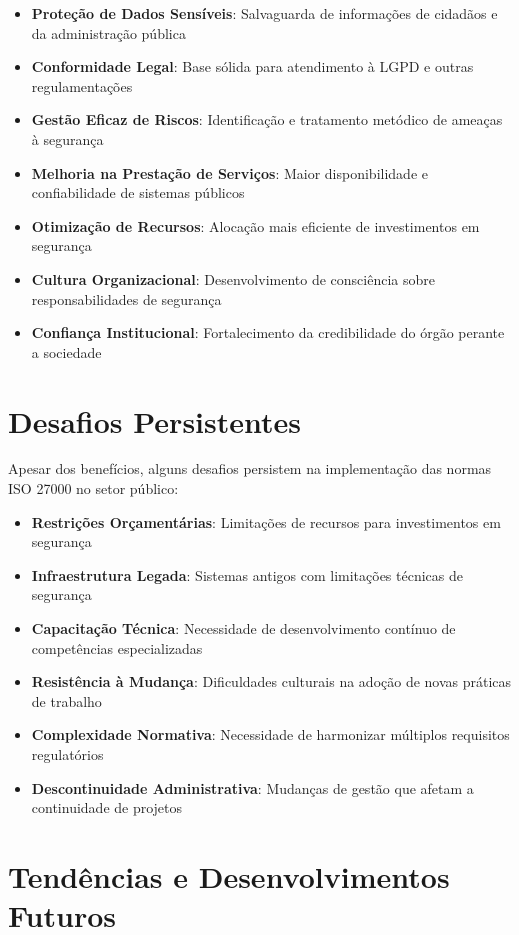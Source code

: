 \documentclass[12pt,a4paper]{report}
\begin{document}
\begin{itemize}
  \item \textbf{Proteção de Dados Sensíveis}: Salvaguarda de informações de cidadãos e da administração pública
  \item \textbf{Conformidade Legal}: Base sólida para atendimento à LGPD e outras regulamentações
  \item \textbf{Gestão Eficaz de Riscos}: Identificação e tratamento metódico de ameaças à segurança
  \item \textbf{Melhoria na Prestação de Serviços}: Maior disponibilidade e confiabilidade de sistemas públicos
  \item \textbf{Otimização de Recursos}: Alocação mais eficiente de investimentos em segurança
  \item \textbf{Cultura Organizacional}: Desenvolvimento de consciência sobre responsabilidades de segurança
  \item \textbf{Confiança Institucional}: Fortalecimento da credibilidade do órgão perante a sociedade
\end{itemize}

\section{Desafios Persistentes}

Apesar dos benefícios, alguns desafios persistem na implementação das normas ISO 27000 no setor público:

\begin{itemize}
  \item \textbf{Restrições Orçamentárias}: Limitações de recursos para investimentos em segurança
  \item \textbf{Infraestrutura Legada}: Sistemas antigos com limitações técnicas de segurança
  \item \textbf{Capacitação Técnica}: Necessidade de desenvolvimento contínuo de competências especializadas
  \item \textbf{Resistência à Mudança}: Dificuldades culturais na adoção de novas práticas de trabalho
  \item \textbf{Complexidade Normativa}: Necessidade de harmonizar múltiplos requisitos regulatórios
  \item \textbf{Descontinuidade Administrativa}: Mudanças de gestão que afetam a continuidade de projetos
\end{itemize}

\section{Tendências e Desenvolvimentos Futuros}
\end{document}
